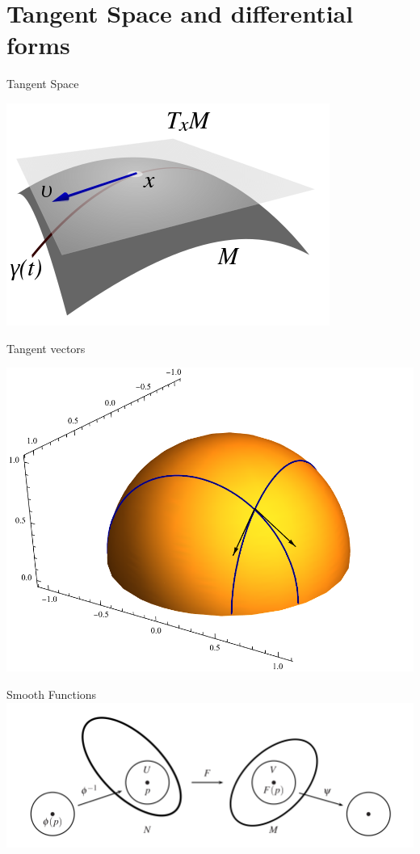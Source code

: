 \documentclass[9pt]{beamer}
\begin{document}
\section{Tangent Space and differential forms}


\begin{frame}{Tangent Space}
    \begin{center}
        
    \includegraphics[scale=0.5]{tangent_space.png}
    \end{center}
\end{frame}

\begin{frame}{Tangent vectors}
\begin{center}
    \includegraphics[scale=0.4]{uppersphere.png}
\end{center}
\end{frame}

\begin{frame}{Smooth Functions}
    \includegraphics[scale=0.55]{smooth_function.PNG}
\end{frame}
\end{document}
